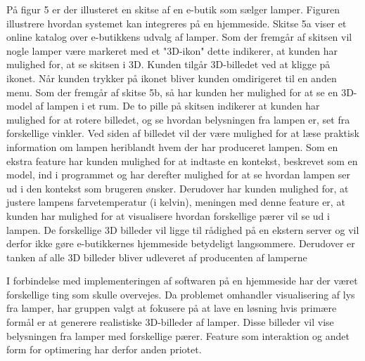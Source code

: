 På figur 5 er der illusteret en skitse af en e-butik som sælger lamper. Figuren illustrere hvordan systemet kan integreres på en hjemmeside. Skitse 5a viser et online katalog over e-butikkens udvalg af lamper. Som der fremgår af skitsen vil nogle lamper være markeret med et "3D-ikon" dette indikerer, at kunden har mulighed for, at se skitsen i 3D. Kunden tilgår 3D-billedet ved at kligge på ikonet. Når kunden trykker på ikonet bliver kunden omdirigeret til en anden menu. Som der fremgår af skitse 5b, så har kunden her mulighed for at se en 3D-model af lampen i et rum. De to pille på skitsen indikerer at kunden har mulighed for at rotere billedet, og se hvordan belysningen fra lampen er, set fra forskellige vinkler. Ved siden af billedet vil der være mulighed for at læse praktisk information om lampen heriblandt hvem der har produceret lampen. Som en ekstra feature har kunden mulighed for at indtaste en kontekst, beskrevet som en model, ind i programmet og har derefter mulighed for at se hvordan lampen ser ud i den kontekst som brugeren ønsker. Derudover har kunden mulighed for, at justere lampens farvetemperatur (i kelvin), meningen med denne feature er, at kunden har mulighed for at visualisere hvordan forskellige pærer vil se ud i lampen. De forskellige 3D billeder vil ligge til rådighed på en ekstern server og vil derfor ikke gøre e-butikkernes hjemmeside betydeligt langsommere. Derudover er tanken af alle 3D billeder bliver udleveret af producenten af lamperne 

I forbindelse med implementeringen af softwaren på en hjemmeside har der været forskellige ting som skulle overvejes. Da problemet omhandler visualisering af lys fra lamper, har gruppen valgt at fokusere på at lave en løsning hvis primære formål er at generere realistiske 3D-billeder af lamper. Disse billeder vil vise belysningen fra lamper med forskellige pærer. Feature som interaktion og andet form for optimering har derfor anden priotet. 



